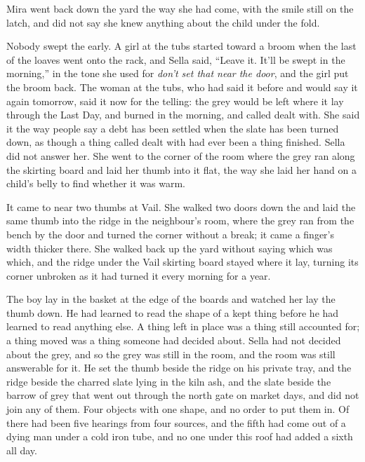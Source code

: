 Mira went back down the yard the way she had come, with the smile still on the latch, and did not say she knew anything about the child under the fold.

\scenebreak

Nobody swept the  early. A girl at the tubs started toward a broom when the last of the loaves went onto the rack, and Sella said, “Leave it. It'll be swept in the morning,” in the tone she used for \emph{don't set that near the door}, and the girl put the broom back. The woman at the tubs, who had said it before and would say it again tomorrow, said it now for the telling: the grey would be left where it lay through the Last Day, and burned in the morning, and called dealt with. She said it the way people say a debt has been settled when the slate has been turned down, as though a thing called dealt with had ever been a thing finished. Sella did not answer her. She went to the corner of the room where the grey ran along the skirting board and laid her thumb into it flat, the way she laid her hand on a child's belly to find whether it was warm.

It came to near two thumbs at Vail. She walked two doors down the  and laid the same thumb into the ridge in the neighbour's room, where the grey ran from the bench by the door and turned the corner without a break; it came a finger's width thicker there. She walked back up the yard without saying which was which, and the ridge under the Vail skirting board stayed where it lay, turning its corner unbroken as it had turned it every morning for a year.

The boy lay in the basket at the edge of the boards and watched her lay the thumb down. He had learned to read the shape of a kept thing before he had learned to read anything else. A thing left in place was a thing still accounted for; a thing moved was a thing someone had decided about. Sella had not decided about the grey, and so the grey was still in the room, and the room was still answerable for it. He set the thumb beside the ridge on his private tray, and the ridge beside the charred slate lying in the kiln ash, and the slate beside the barrow of grey that went out through the north gate on market days, and did not join any of them. Four objects with one shape, and no order to put them in. Of  there had been five hearings from four sources, and the fifth had come out of a dying man under a cold iron tube, and no one under this roof had added a sixth all day.

